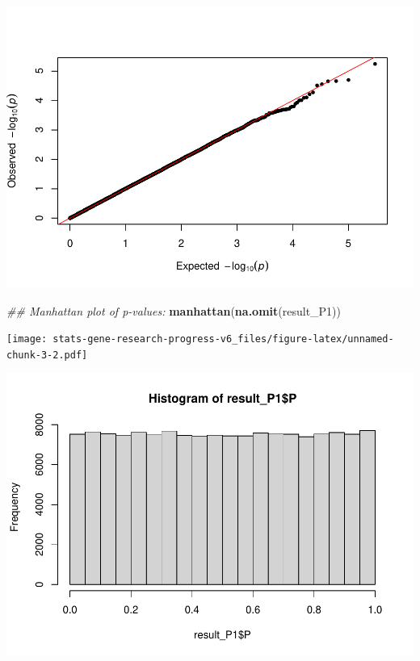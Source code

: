 \documentclass[
]{article}
\newenvironment{Shaded}{\begin{snugshade}}{\end{snugshade}}
\newcommand{\CommentTok}[1]{\textcolor[rgb]{0.56,0.35,0.01}{\textit{#1}}}
\newcommand{\DataTypeTok}[1]{\textcolor[rgb]{0.13,0.29,0.53}{#1}}
\newcommand{\DecValTok}[1]{\textcolor[rgb]{0.00,0.00,0.81}{#1}}
\newcommand{\KeywordTok}[1]{\textcolor[rgb]{0.13,0.29,0.53}{\textbf{#1}}}
\newcommand{\NormalTok}[1]{#1}
\newcommand{\OperatorTok}[1]{\textcolor[rgb]{0.81,0.36,0.00}{\textbf{#1}}}
\begin{document}
\begin{Shaded}
\end{Shaded}

\includegraphics{stats-gene-research-progress-v6_files/figure-latex/unnamed-chunk-3-1.pdf}

\begin{Shaded}
\begin{Highlighting}[]
\CommentTok{## Manhattan plot of p-values:}
\KeywordTok{manhattan}\NormalTok{(}\KeywordTok{na.omit}\NormalTok{(result_P1))}
\end{Highlighting}
\end{Shaded}

\texttt{[image: stats-gene-research-progress-v6\_files/figure-latex/unnamed-chunk-3-2.pdf]}

\begin{Shaded}
\end{Shaded}

\includegraphics{stats-gene-research-progress-v6_files/figure-latex/unnamed-chunk-3-3.pdf}
\end{document}
